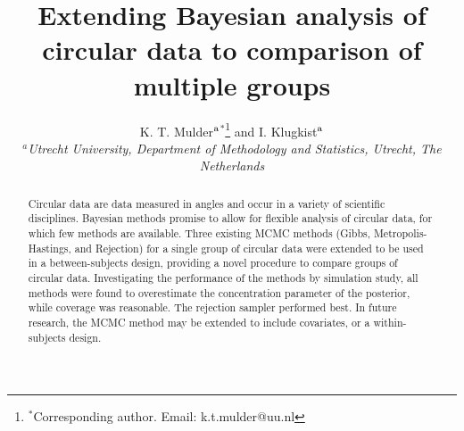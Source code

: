 \documentclass[]{gSCS2e}
\theoremstyle{plain}
\theoremstyle{definition}
\theoremstyle{remark}
\begin{document}
%
\renewcommand{\thefootnote}{\fnsymbol{footnote}}

%
%

%


\title{{Extending Bayesian analysis of circular data to comparison of multiple groups }}

\author{K. T. Mulder$^{\rm a}$$^{\ast}$\thanks{$^\ast$Corresponding author. Email: k.t.mulder@uu.nl
\vspace{6pt}} and I. Klugkist$^{\rm a}$\\\vspace{6pt}  $^{a}${\em{Utrecht University, Department of Methodology and Statistics, Utrecht, The Netherlands}}}


\maketitle


\begin{abstract}
Circular data are data measured in angles and occur in a variety of scientific disciplines. Bayesian methods promise to allow for flexible analysis of circular data, for which few methods are available. Three existing MCMC methods (Gibbs, Metropolis-Hastings, and Rejection) for a single group of circular data were extended to be used in a between-subjects design, providing a novel procedure to compare groups of circular data. Investigating the performance of the methods by simulation study, all methods were found to overestimate the concentration parameter of the posterior, while coverage was reasonable. The rejection sampler performed best. In future research, the MCMC method may be extended to include covariates, or a within-subjects design. 


\end{abstract}
\end{document}
